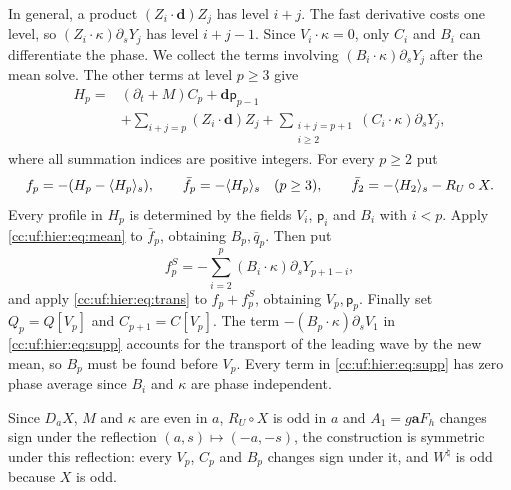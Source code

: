 In general, a product $(Z_i\cdot\mathbf d)Z_j$ has level $i+j$.
The fast derivative costs one level, so $(Z_i\cdot\kappa)\partial_sY_j$
has level $i+j-1$. Since $V_i\cdot\kappa=0$, only $C_i$ and $B_i$ can
differentiate the phase. We collect the terms involving
$(B_i\cdot\kappa)\partial_sY_j$ after the mean solve. The other
terms at level $p\ge3$ give
\begin{align}
 H_p={}&(\partial_t+M)C_p+\mathbf d\mathsf p_{p-1}\nonumber\\
 &+\sum_{i+j=p}(Z_i\cdot\mathbf d)Z_j
   +\sum_{\substack{i+j=p+1\\i\ge2}}
                  (C_i\cdot\kappa)\partial_sY_j,\label{cc:uf:hier:eq:Hp}
\end{align}
where all summation indices are positive integers.
For every $p\ge2$ put
\begin{equation}\label{cc:uf:hier:eq:source}
 f_p=-(H_p-\langle H_p\rangle_s),\qquad \bar f_p=-\langle H_p\rangle_s\quad(p\ge3),\qquad
 \bar f_2=-\langle H_2\rangle_s-R_U\circ X.
\end{equation}
Every profile in $H_p$ is determined by the fields $V_i$,
$\mathsf p_i$ and $B_i$ with $i<p$.
Apply \eqref{cc:uf:hier:eq:mean} to $\bar f_p$, obtaining $B_p,\bar q_p$.
Then put
\begin{equation}\label{cc:uf:hier:eq:supp}
 f_p^S=-\sum_{i=2}^p(B_i\cdot\kappa)\partial_sY_{p+1-i},
\end{equation}
and apply \eqref{cc:uf:hier:eq:trans} to $f_p+f_p^S$, obtaining $V_p,\mathsf p_p$.
Finally set $Q_p=Q[V_p]$ and $C_{p+1}=C[V_p]$.
The term $-(B_p\cdot\kappa)\partial_sV_1$ in
\eqref{cc:uf:hier:eq:supp} accounts for the transport of the leading wave
by the new mean, so $B_p$ must be found before $V_p$. Every term in
\eqref{cc:uf:hier:eq:supp} has zero phase average since $B_i$ and
$\kappa$ are phase independent.

Since $D_aX$, $M$ and $\kappa$ are even in $a$, $R_U\circ X$ is odd in
$a$ and $A_1=g\mathbf aF_h$ changes sign under the reflection
$(a,s)\mapsto(-a,-s)$, the construction is symmetric under this
reflection: every $V_p$, $C_p$ and $B_p$ changes sign under it, and
$W^\natural$ is odd because $X$ is odd.

